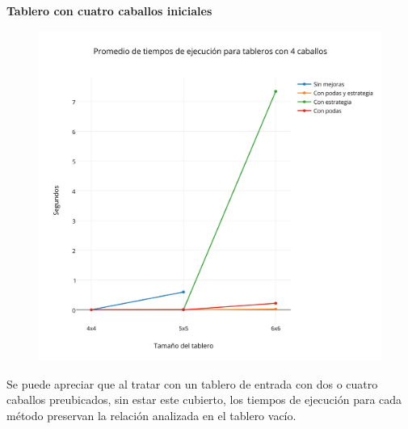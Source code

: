  \newpage
 
\textbf{{\Large Tablero con cuatro caballos iniciales}}

 \begin{figure}[h!]
   \begin{center}
   \includegraphics[scale=0.3]{../src/ej3/Mediciones/4caballos/promedios1.png} 
   \end{center}
 \end{figure}
 
Se puede apreciar que al tratar con un tablero de entrada con dos o cuatro caballos preubicados, sin estar este cubierto, los tiempos de ejecución para cada método preservan la relaci\'on analizada en el tablero vac\'io.\\




 
